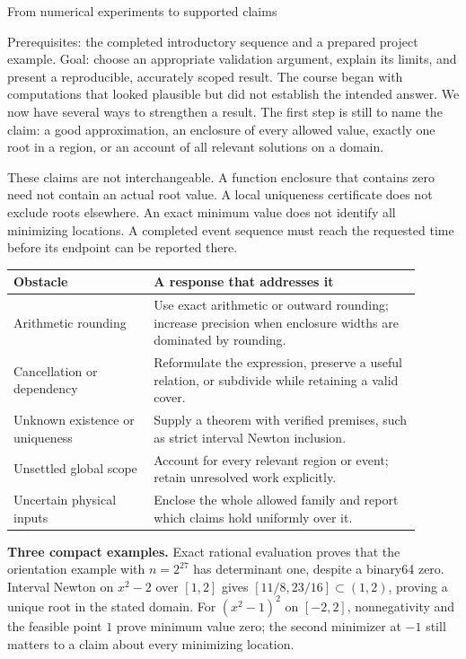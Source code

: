 \def\lecturenumber{14}


\opening{From numerical experiments to supported claims}{Prerequisites: the completed introductory sequence and a prepared project example.\newline
Goal: choose an appropriate validation argument, explain its limits, and present a reproducible, accurately scoped result.}
The course began with computations that looked plausible but did not
establish the intended answer. We now have several ways to strengthen a
result. The first step is still to name the claim: a good approximation,
an enclosure of every allowed value, exactly one root in a region, or an
account of all relevant solutions on a domain.

These claims are not interchangeable. A function enclosure that contains
zero need not contain an actual root value. A local uniqueness certificate
does not exclude roots elsewhere. An exact minimum value does not identify
all minimizing locations. A completed event sequence must reach the requested
time before its endpoint can be reported there.

\begin{center}
\begin{tabular}{p{0.31\linewidth}p{0.59\linewidth}}
\toprule
Obstacle & A response that addresses it\\
\midrule
Arithmetic rounding & Use exact arithmetic or outward rounding; increase
precision when enclosure widths are dominated by rounding.\\[4pt]
Cancellation or dependency & Reformulate the expression, preserve a useful
relation, or subdivide while retaining a valid cover.\\[4pt]
Unknown existence or uniqueness & Supply a theorem with verified premises,
such as strict interval Newton inclusion.\\[4pt]
Unsettled global scope & Account for every relevant region or event;
retain unresolved work explicitly.\\[4pt]
Uncertain physical inputs & Enclose the whole allowed family and report
which claims hold uniformly over it.\\
\bottomrule
\end{tabular}
\end{center}

\textbf{Three compact examples.} Exact rational evaluation proves that the
orientation example with $n=2^{27}$ has determinant one, despite a binary64
zero. Interval Newton on $x^2-2$ over $[1,2]$ gives
$[11/8,23/16]\subset(1,2)$, proving a unique root in the stated domain.
For $(x^2-1)^2$ on $[-2,2]$, nonnegativity and the feasible point $1$
prove minimum value zero; the second minimizer at $-1$ still matters to a
claim about every minimizing location.

